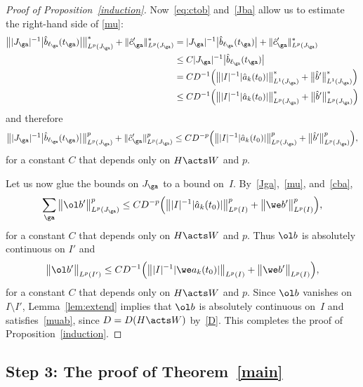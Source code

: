 \begin{proof}[Proof of Proposition~\ref{induction}]
{}


Now~\eqref{eq:ctob} and~\eqref{Jba} allow us to estimate the right-hand side of
\eqref{mu}:
\begin{align*}
 \big\||J_\ga|^{-1} \big|\hat b_{\ell_\ga}(t_\ga)\big| \big\|^*_{L^p (J_\ga)}
 + \|\hat c_{\ga}'\|^*_{L^p (J_\ga)}
 &= |J_\ga|^{-1} \big|\hat b_{\ell_\ga}(t_\ga)\big| +
 \|\hat c_{\ga}'\|^*_{L^p (J_\ga)}
 \\
 &\le C |J_\ga|^{-1} \big|\hat b_{\ell_\ga}(t_\ga)\big|
 \\
 &= C D^{-1} \Big( \big\| |I|^{-1} {|\hat a_k(t_0)|} \big\|^*_{L^1 (J_\ga)}
 + \big\|\hat b'\big\|^*_{L^1 (J_\ga)}\Big)
 \\
 &\le C D^{-1} \Big( \big\| |I|^{-1} {|\hat a_k(t_0)|} \big\|^*_{L^p (J_\ga)}
 + \big\|\hat b'\big\|^*_{L^p (J_\ga)}\Big)
\end{align*}
and therefore
\begin{gather}
\big \||J_\ga|^{-1} \big|\hat b_{\ell_\ga}(t_\ga)\big|\big \|^p_{L^p (J_\ga)}
 + \|\hat c_{\ga}'\|^p_{L^p (J_\ga)}
 \le C D^{-p} \Big( \big\| |I|^{-1} {|\hat a_k(t_0)|} \big\|^p_{L^p (J_\ga)}
 + \big\|\hat b'\big\|^p_{L^p (J_\ga)}\Big), \label{cba}
\end{gather}
for a constant $C$ that depends only on $H \acts W$ and $p$.




Let us now glue the bounds on $J_\ga$ to a bound on~$I$. By~\eqref{Jga},~\eqref{mu}, and~\eqref{cba},
\begin{gather*} %
 \sum_\ga \big\|\ol b'\big\|^p_{L^p(J_\ga)}
 \le C D^{-p} \Big( \big\| |I|^{-1} {|\hat a_k(t_0)|} \big\|^p_{L^p (I)}
 + \big\|\we b'\big\|^p_{L^p (I)}\Big),
\end{gather*}
for a constant $C$ that depends only on $H \acts W$ and $p$.
Thus $\ol b$ is absolutely continuous on $I'$
and
\begin{gather*}
 \big\|\ol b'\big\|_{L^p(I')}
 \le C D^{-1} \Big( \big\| |I|^{-1} {|\we a_k(t_0)|} \big\|_{L^p (I)}
 + \big\|\we b'\big\|_{L^p (I)}\Big),
\end{gather*}
for a constant $C$ that depends only on $H \acts W$ and $p$.
Since $\ol b$ vanishes on $I \setminus I'$,
Lemma~\ref{lem:extend} implies that $\ol b$ is absolutely continuous on~$I$ and
satisfies~\eqref{muab}, since $D = D(H \acts W)$ by~\eqref{D}.
This completes the proof of Proposition~\ref{induction}.
\end{proof}

\subsection*{Step 3: The proof of Theorem~\ref{main}}

